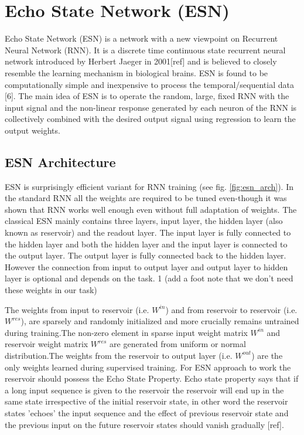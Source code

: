 \section{Echo State Network (ESN)}

Echo State Network (ESN) is a network with a new viewpoint on Recurrent Neural Network (RNN). It is a discrete time continuous state recurrent neural network introduced by Herbert Jaeger in 2001[ref] and is believed to closely resemble the learning mechanism in biological brains. ESN is found to be computationally simple and inexpensive to process the temporal/sequential data [6]. The main idea of ESN is to operate the random, large, fixed RNN with the input signal and the non-linear response generated by each neuron of the RNN is collectively combined with the desired output signal using regression to learn the output weights.

\subsection{ESN Architecture}

ESN is surprisingly efficient variant for RNN training (see fig. \ref{fig:esn_arch}). In the standard RNN all the weights are required to be tuned even-though it was shown that RNN works well enough even without full adaptation of weights. The classical ESN mainly contains three layers, input layer, the hidden layer (also known as reservoir) and the readout layer. The input layer is fully connected to the hidden layer and both the hidden layer and the input layer is connected to the output layer. The output layer is fully connected back to the hidden layer. However the connection from input to output layer and output layer to hidden layer is optional and depends on the task. 1 (add a foot note that we don't need these weights in our task)

The weights from input to reservoir (i.e. $W^{in}$) and from reservoir to reservoir (i.e.
$W^{res}$), are sparsely and randomly initialized and more crucially remains untrained during training.The non-zero element in sparse input weight matrix $W^{in}$ and reservoir weight matrix $W^{res}$ are generated from uniform or normal distribution.The weights from the reservoir to output layer (i.e. $W^{out}$) are the only weights learned during supervised training. For ESN approach to work the reservoir should possess the Echo State Property. Echo state property says that if a long input sequence is given to the reservoir the reservoir will end up in the same state irrespective of the initial reservoir state, in other word the reservoir states 'echoes' the input sequence and the effect of previous reservoir state and the previous input on the future reservoir states should vanish gradually [ref]. 

